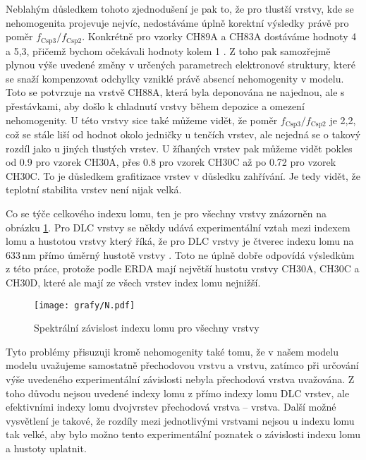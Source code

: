 Neblahým důsledkem tohoto zjednodušení je pak to, že pro tlustší vrstvy, kde se nehomogenita projevuje nejvíc, nedostáváme úplně korektní výsledky právě pro poměr $f_\mathrm{Csp3}/f_\mathrm{Csp2}$. Konkrétně pro vzorky CH89A a CH83A dostáváme hodnoty 4 a 5,3, přičemž bychom očekávali hodnoty kolem 1 \cite{Robertson2002}. 
Z toho pak samozřejmě plynou výše uvedené změny v určených parametrech elektronové struktury, které se snaží kompenzovat odchylky vzniklé právě absencí nehomogenity v modelu. Toto se potvrzuje na vrstvě CH88A, která byla deponována ne najednou, ale s přestávkami, aby došlo k chladnutí vrstvy během depo\-zi\-ce a omezení nehomogenity. 
U této vrstvy sice také můžeme vidět, že poměr $f_\mathrm{Csp3}/f_\mathrm{Csp2}$ je 2,2, což se stále liší od hodnot okolo jedničky u tenčích vrstev, ale nejedná se o takový rozdíl jako u jiných tlustých vrstev. 
U žíhaných vrstev pak můžeme vidět pokles od 0.9 pro vzorek CH30A, přes 0.8 pro vzorek CH30C až po 0.72 pro vzorek CH30C. To je důsledkem grafitizace vrstev v důsledku zahřívání. Je tedy vidět, že teplotní stabilita vrstev není nijak velká. 

Co se týče celkového indexu lomu, ten je pro všechny vrstvy znázorněn na obrázku \ref{index}. Pro DLC vrstvy se někdy udává experimentální vztah mezi indexem lomu a hustotou vrstvy který říká, že pro DLC vrstvy je čtverec indexu lomu na 633\,nm přímo úměrný hustotě vrstvy \cite{Donnet2008}. Toto ne úplně dobře odpovídá výsledkům z této práce, protože podle ERDA mají největší hustotu vrstvy CH30A, CH30C a CH30D, které ale mají ze všech vrstev index lomu nejnižší. 

\begin{figure}[tbhp]
	\texttt{[image: grafy/N.pdf]}
	\caption{Spektrální závislost indexu lomu pro všechny vrstvy} 
	\label{index}
\end{figure}

Tyto problémy přisuzuji kromě nehomogenity také tomu, že v našem modelu modelu uvažujeme samostatně přechodovou vrstvu a vrstvu, zatímco při určování výše uvedeného experimentální závislosti nebyla přechodová vrstva uvažována. Z toho důvodu nejsou uvedené indexy lomu z \cite{Donnet2008} přímo indexy lomu DLC vrstev, ale efektivními indexy lomu dvojvrstev přechodová vrstva -- vrstva. Další možné vysvětlení je takové, že rozdíly mezi jednotlivými vrstvami nejsou u indexu lomu tak velké, aby bylo možno tento experimentální poznatek o závislosti indexu lomu a hustoty uplatnit. 

